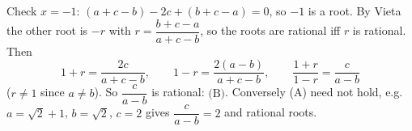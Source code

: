 Check $x=-1$: $(a+c-b)-2c+(b+c-a)=0$, so $-1$ is a root. By Vieta the other root is $-r$ with $r=\dfrac{b+c-a}{a+c-b}$, so the roots are rational iff $r$ is rational. Then
\[1+r=\dfrac{2c}{a+c-b},\qquad1-r=\dfrac{2(a-b)}{a+c-b},\qquad\dfrac{1+r}{1-r}=\dfrac{c}{a-b}\]
($r\ne1$ since $a\ne b$). So $\dfrac {c}{a-b}$ is rational: $\boxed{\text{(B)}}$. Conversely (A) need not hold, e.g. $a=\sqrt2+1$, $b=\sqrt2$, $c=2$ gives $\dfrac{c}{a-b}=2$ and rational roots.
